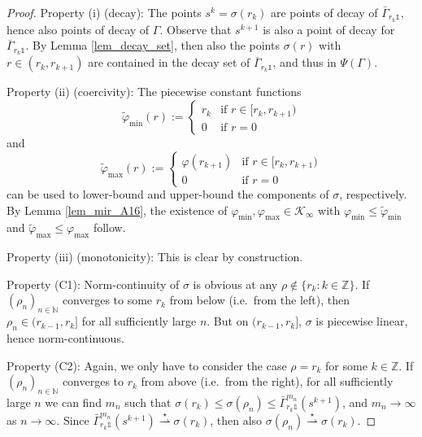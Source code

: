 \documentclass[10pt, oneside, a4paper]{article}
\newcommand{\N}{\mathbb{N}}
\newcommand{\Z}{\mathbb{Z}}
\newcommand{\unit}{\mathds{1}}
\newcommand{\KC}{\mathcal{K}}
\newcommand{\bsign}[1]{\bar{#1}}
\begin{document}
\begin{proof}
Property (i) (decay): The points $s^k = \sigma(r_k)$ are points of decay of $\bsign{\Gamma}_{r_k\unit}$, hence also points of decay of $\Gamma$. Observe that $s^{k+1}$ is also a point of decay for $\bsign{\Gamma}_{r_k\unit}$. By Lemma \ref{lem_decay_set}, then also the points $\sigma(r)$ with $r \in (r_k,r_{k+1})$ are contained in the decay set of $\bsign{\Gamma}_{r_k\unit}$, and thus in $\Psi(\Gamma)$.%

Property (ii) (coercivity): The piecewise constant functions%
\begin{equation*}
  \tilde{\varphi}_{\min}(r) := \left\{\begin{array}{rl}
	                                       r_k & \mbox{if } r \in [r_k,r_{k+1}) \\
																				   0 & \mbox{if } r = 0
																			\end{array}\right.%
\end{equation*}
and
\begin{equation*}
  \tilde{\varphi}_{\max}(r) := \left\{\begin{array}{rl}
	                                     \varphi(r_{k+1}) & \mbox{if } r \in [r_k,r_{k+1}) \\
																				   0 & \mbox{if } r = 0
																			\end{array}\right.
\end{equation*}
can be used to lower-bound and upper-bound the components of $\sigma$, respectively. By Lemma \ref{lem_mir_A16}, the existence of $\varphi_{\min},\varphi_{\max} \in \KC_{\infty}$ with $\varphi_{\min} \leq \tilde{\varphi}_{\min}$ and $\tilde{\varphi}_{\max} \leq \varphi_{\max}$ follow.%

Property (iii) (monotonicity): This is clear by construction.%

Property (C1): Norm-continuity of $\sigma$ is obvious at any $\rho \notin \{r_k : k \in \Z\}$. If $(\rho_n)_{n\in\N}$ converges to some $r_k$ from below (i.e.~from the left), then $\rho_n \in (r_{k-1},r_k]$ for all sufficiently large $n$. But on $(r_{k-1},r_k]$, $\sigma$ is piecewise linear, hence norm-continuous.%
 
Property (C2): Again, we only have to consider the case $\rho = r_k$ for some $k \in \Z$. If $(\rho_n)_{n\in\N}$ converges to $r_k$ from above (i.e.~from the right), for all sufficiently large $n$ we can find $m_n$ such that $\sigma(r_k) \leq \sigma(\rho_n) \leq \bsign{\Gamma}_{r_k\unit}^{m_n}(s^{k+1})$, and $m_n \rightarrow \infty$ as $n \rightarrow \infty$. Since $\bsign{\Gamma}_{r_k\unit}^{m_n}(s^{k+1}) \stackrel{\star}{\rightharpoonup} \sigma(r_k)$, then also $\sigma(\rho_n) \stackrel{\star}{\rightharpoonup} \sigma(r_k)$.
\end{proof}
\end{document}
